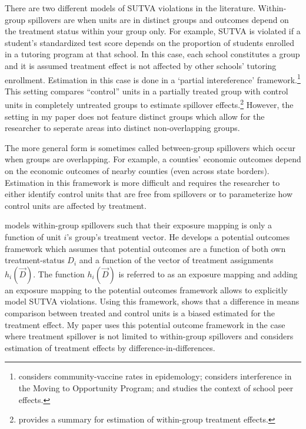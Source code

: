 \documentclass[11pt]{article}
\begin{document}
There are two different models of SUTVA violations in the literature. Within-group spillovers are when units are in distinct groups and outcomes depend on the treatment status within your group only. For example, SUTVA is violated if a student's standardized test score depends on the proportion of students enrolled in a tutoring program at that school. In this case, each school constitutes a group and it is assumed treatment effect is not affected by other schools' tutoring enrollment. Estimation in this case is done in a `partial intereference' framework.\footnote{\citet{Halloran_Struchiner_1995} considers community-vaccine rates in epidemology; \citet{Sobel_2006} considers interference in the Moving to Opportunity Program; and \citet{Angrist_2014} studies the context of school peer effects.} This setting compares ``control'' units in a partially treated group with control units in completely untreated groups to estimate spillover effects.\footnote{\citet{Angelucci_DiMaro_2016} provides a summary for estimation of within-group treatment effects.} However, the setting in my paper does not feature distinct groups which allow for the researcher to seperate areas into distinct non-overlapping groups.

The more general form is sometimes called between-group spillovers which occur when groups are overlapping. For example, a counties' economic outcomes depend on the economic outcomes of nearby counties (even across state borders). Estimation in this framework is more difficult and requires the researcher to either identify control units that are free from spillovers or to parameterize how control units are affected by treatment.

\citet{Vazquez-Bare_2019} models within-group spillovers such that their exposure mapping is only a function of unit $i$'s group's treatment vector. He develops a potential outcomes framework which assumes that potential outcomes are a function of both own treatment-status $D_i$ and a function of the vector of treatment assignments $h_i(\vec{D})$. The function $h_i(\vec{D})$ is referred to as an exposure mapping and adding an exposure mapping to the potential outcomes framework allows to explicitly model SUTVA violations. Using this framework, \citet{Vazquez-Bare_2019} shows that a difference in means comparison between treated and control units is a biased estimated for the treatment effect. My paper uses this potential outcome framework in the case where treatment spillover is not limited to within-group spillovers and considers estimation of treatment effects by difference-in-differences. 
\end{document}

